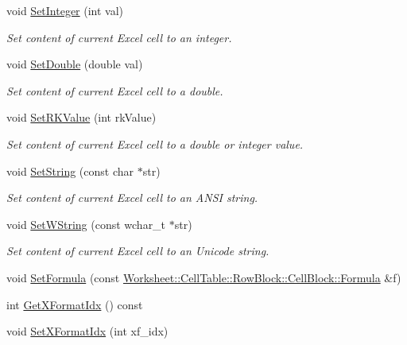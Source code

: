 \begin{DoxyCompactItemize}
void \hyperlink{class_y_excel_1_1_basic_excel_cell_a443a4516b69479916e26d4a817c295c0}{Set\+Integer} (int val)
\begin{DoxyCompactList}\small\item\em Set content of current Excel cell to an integer. \end{DoxyCompactList}\item 
void \hyperlink{class_y_excel_1_1_basic_excel_cell_a1551d6351baa92be4b053491a7212617}{Set\+Double} (double val)
\begin{DoxyCompactList}\small\item\em Set content of current Excel cell to a double. \end{DoxyCompactList}\item 
void \hyperlink{class_y_excel_1_1_basic_excel_cell_ac74c7f427b9d2db5cebac8614333639f}{Set\+R\+K\+Value} (int rk\+Value)
\begin{DoxyCompactList}\small\item\em Set content of current Excel cell to a double or integer value. \end{DoxyCompactList}\item 
void \hyperlink{class_y_excel_1_1_basic_excel_cell_ae8da861167bf5d90eb6234c43e977ddc}{Set\+String} (const char $\ast$str)
\begin{DoxyCompactList}\small\item\em Set content of current Excel cell to an A\+N\+S\+I string. \end{DoxyCompactList}\item 
void \hyperlink{class_y_excel_1_1_basic_excel_cell_aee14ddca30b02a3660cbef4699520e11}{Set\+W\+String} (const wchar\+\_\+t $\ast$str)
\begin{DoxyCompactList}\small\item\em Set content of current Excel cell to an Unicode string. \end{DoxyCompactList}\item 
void \hyperlink{class_y_excel_1_1_basic_excel_cell_adf44468200e0744b0da06f2cc1e11712}{Set\+Formula} (const \hyperlink{struct_y_excel_1_1_worksheet_1_1_cell_table_1_1_row_block_1_1_cell_block_1_1_formula}{Worksheet\+::\+Cell\+Table\+::\+Row\+Block\+::\+Cell\+Block\+::\+Formula} \&f)
\item 
int \hyperlink{class_y_excel_1_1_basic_excel_cell_ae91320d5925679253e0313c7dee50949}{Get\+X\+Format\+Idx} () const 
\item 
void \hyperlink{class_y_excel_1_1_basic_excel_cell_aabca84f7f814a484496309655531be5f}{Set\+X\+Format\+Idx} (int xf\+\_\+idx)

\end{DoxyCompactItemize}
